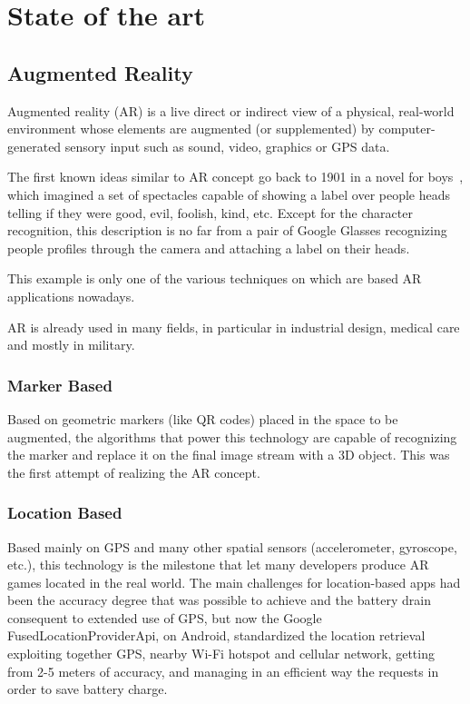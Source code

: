 \chapter{State of the art}

	\section{Augmented Reality}
	
		\begin{quoting}
			Augmented reality (AR) is a live direct or indirect view of a physical, real-world environment whose elements are augmented (or supplemented) by computer-generated sensory input such as sound, video, graphics or GPS data.~\cite{wiki:ar}
		\end{quoting}
		
		The first known ideas similar to AR concept go back to 1901 in a novel for boys~\cite{baum:master}, which imagined a set of spectacles capable of showing a label over people heads telling if they were good, evil, foolish, kind, etc.
		Except for the character recognition, this description is no far from a pair of Google Glasses recognizing people profiles through the camera and attaching a label on their heads.
		
		This example is only one of the various techniques on which are based AR applications nowadays.
		
		AR is already used in many fields, in particular in industrial design, medical care and mostly in military.
		
		\subsection{Marker Based}
			
			Based on geometric markers (like QR codes) placed in the space to be augmented, the algorithms that power this technology are capable of recognizing the marker and replace it on the final image stream with a 3D object.
			This was the first attempt of realizing the AR concept.
			
		
		\subsection{Location Based}
		
			Based mainly on GPS and many other spatial sensors (accelerometer, gyroscope, etc.), this technology is the milestone that let many developers produce AR games located in the real world.
			The main challenges for location-based apps had been the accuracy degree that was possible to achieve and the battery drain consequent to extended use of GPS, but now the Google FusedLocationProviderApi, on Android, standardized the location retrieval exploiting together GPS, nearby Wi-Fi hotspot and cellular network, getting from 2-5 meters of accuracy, and managing in an efficient way the requests in order to save battery charge. %

